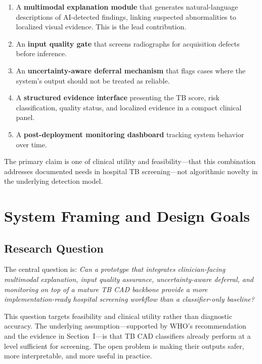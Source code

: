 \documentclass[conference, letterpaper]{IEEEtran}
\begin{document}
\begin{enumerate}
    \item A \textbf{multimodal explanation module} that generates natural-language descriptions of AI-detected findings, linking suspected abnormalities to localized visual evidence. This is the lead contribution.
    \item An \textbf{input quality gate} that screens radiographs for acquisition defects before inference.
    \item An \textbf{uncertainty-aware deferral mechanism} that flags cases where the system's output should not be treated as reliable.
    \item A \textbf{structured evidence interface} presenting the TB score, risk classification, quality status, and localized evidence in a compact clinical panel.
    \item A \textbf{post-deployment monitoring dashboard} tracking system behavior over time.
\end{enumerate}

The primary claim is one of clinical utility and feasibility---that this combination addresses documented needs in hospital TB screening---not algorithmic novelty in the underlying detection model.

\section{System Framing and Design Goals}

\subsection{Research Question}

The central question is: \textit{Can a prototype that integrates clinician-facing multimodal explanation, input quality assurance, uncertainty-aware deferral, and monitoring on top of a mature TB CAD backbone provide a more implementation-ready hospital screening workflow than a classifier-only baseline?}

This question targets feasibility and clinical utility rather than diagnostic accuracy. The underlying assumption---supported by WHO's recommendation and the evidence in Section~I---is that TB CAD classifiers already perform at a level sufficient for screening. The open problem is making their outputs safer, more interpretable, and more useful in practice.
\end{document}
